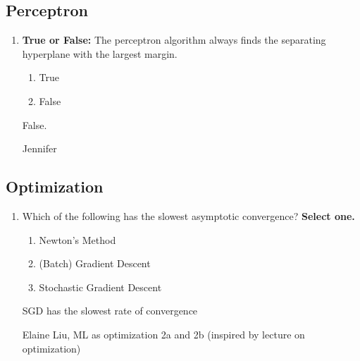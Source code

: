 \subsection{Perceptron}
\begin{enumerate}
    
    \item{} \textbf{True or False:} The perceptron algorithm always finds the separating hyperplane with the largest margin.
    
    \begin{enumerate}
        \item True
        \item False
    \end{enumerate}
    
    \begin{soln}
    False.
    \end{soln}
    
    \begin{qauthor}
        Jennifer    
    \end{qauthor}
    
\end{enumerate}

\subsection{Optimization}

\begin{enumerate}
    
    \item{} Which of the following has the slowest asymptotic convergence? \textbf{Select one.}
    \begin{enumerate}
        \item Newton's Method
        \item (Batch) Gradient Descent
        \item Stochastic Gradient Descent
    \end{enumerate}
    
    \begin{soln}
    SGD has the slowest rate of convergence
    \end{soln}
    
    \begin{qauthor}
    Elaine Liu, ML as optimization 2a and 2b (inspired by lecture on optimization)
    \end{qauthor}
    
\end{enumerate}

